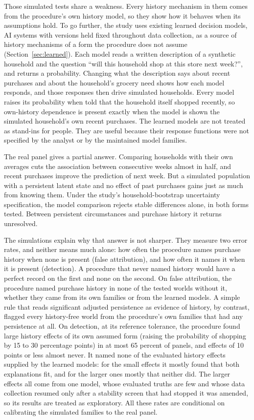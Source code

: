 \documentclass[11pt]{article}
\begin{document}
Those simulated tests share a weakness. Every history mechanism in them comes from the
procedure's own history model, so they show how it behaves when its assumptions hold. To go
further, the study uses existing learned decision models, AI systems with versions held fixed
throughout data collection, as a source of history mechanisms of a form the procedure does not assume
(Section~\ref{sec:learned}). Each model reads a written description of a synthetic household
and the question ``will this household shop at this store next week?'', and returns a
probability. Changing what the description says about recent purchases and about the
household's grocery need shows how each model responds, and those responses then drive
simulated households. Every model raises its probability when told that the household itself
shopped recently, so own-history dependence is present exactly when the model is shown the
simulated household's own recent purchases. The learned models are not treated as stand-ins for people. They are useful
because their response functions were not specified by the analyst or by the maintained model
families.

The real panel gives a partial answer. Comparing households with their own averages cuts the
association between consecutive weeks almost in half, and recent purchases improve the
prediction of next week. But a simulated population with a persistent latent state and no
effect of past purchases gains just as much from knowing them. Under the study's household-bootstrap
uncertainty specification, the model comparison rejects stable differences alone, in both forms
tested. Between persistent circumstances and purchase
history it returns unresolved.

The simulations explain why that answer is not sharper. They measure two error rates, and
neither means much alone: how often the procedure names purchase history when none is
present (false attribution), and how often it names it when it is present (detection). A
procedure that never named history would have a perfect record on the first and none on the
second. On false attribution, the procedure named purchase history in none of the tested
worlds without it, whether they came from its own families or from the learned models. A simple
rule that reads significant adjusted persistence as evidence of history, by contrast, flagged
every history-free world from the procedure's own families that had any persistence at all.
On detection, at its reference tolerance, the procedure found large history effects of its own
assumed form (raising the probability of shopping by 15 to 30 percentage points) in at most
65 percent of panels, and effects of 10 points or less almost never. It named none of the
evaluated history effects supplied by the learned models: for the small effects it mostly found that
both explanations fit, and for the larger ones mostly that neither did. The larger effects all
come from one model, whose evaluated truths are few and whose data collection resumed only after
a stability screen that had stopped it was amended, so its results are treated as exploratory. All these rates are
conditional on calibrating the simulated families to the real panel.
\end{document}
